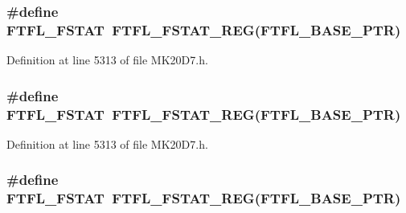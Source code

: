 \subsubsection[{\texorpdfstring{F\+T\+F\+L\+\_\+\+F\+S\+T\+AT}{FTFL_FSTAT}}]{\setlength{\rightskip}{0pt plus 5cm}\#define F\+T\+F\+L\+\_\+\+F\+S\+T\+AT~{\bf F\+T\+F\+L\+\_\+\+F\+S\+T\+A\+T\+\_\+\+R\+EG}({\bf F\+T\+F\+L\+\_\+\+B\+A\+S\+E\+\_\+\+P\+TR})}\hypertarget{group___f_t_f_l___register___accessor___macros_gaf013df9b271efd73b20bbad665ed5ce8}{}\label{group___f_t_f_l___register___accessor___macros_gaf013df9b271efd73b20bbad665ed5ce8}


Definition at line 5313 of file M\+K20\+D7.\+h.

\subsubsection[{\texorpdfstring{F\+T\+F\+L\+\_\+\+F\+S\+T\+AT}{FTFL_FSTAT}}]{\setlength{\rightskip}{0pt plus 5cm}\#define F\+T\+F\+L\+\_\+\+F\+S\+T\+AT~{\bf F\+T\+F\+L\+\_\+\+F\+S\+T\+A\+T\+\_\+\+R\+EG}({\bf F\+T\+F\+L\+\_\+\+B\+A\+S\+E\+\_\+\+P\+TR})}\hypertarget{group___f_t_f_l___register___accessor___macros_gaf013df9b271efd73b20bbad665ed5ce8}{}\label{group___f_t_f_l___register___accessor___macros_gaf013df9b271efd73b20bbad665ed5ce8}


Definition at line 5313 of file M\+K20\+D7.\+h.

\subsubsection[{\texorpdfstring{F\+T\+F\+L\+\_\+\+F\+S\+T\+AT}{FTFL_FSTAT}}]{\setlength{\rightskip}{0pt plus 5cm}\#define F\+T\+F\+L\+\_\+\+F\+S\+T\+AT~{\bf F\+T\+F\+L\+\_\+\+F\+S\+T\+A\+T\+\_\+\+R\+EG}({\bf F\+T\+F\+L\+\_\+\+B\+A\+S\+E\+\_\+\+P\+TR})}\hypertarget{group___f_t_f_l___register___accessor___macros_gaf013df9b271efd73b20bbad665ed5ce8}{}\label{group___f_t_f_l___register___accessor___macros_gaf013df9b271efd73b20bbad665ed5ce8}


